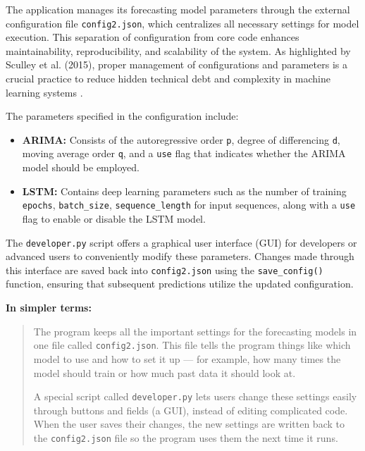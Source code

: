 The application manages its forecasting model parameters through the external configuration file \texttt{config2.json}, which centralizes all necessary settings for model execution. This separation of configuration from core code enhances maintainability, reproducibility, and scalability of the system. As highlighted by Sculley et al. (2015), proper management of configurations and parameters is a crucial practice to reduce hidden technical debt and complexity in machine learning systems \cite{sculley2015hidden}.


The parameters specified in the configuration include:

\begin{itemize}
	\item \textbf{ARIMA:} Consists of the autoregressive order \texttt{p}, degree of differencing \texttt{d}, moving average order \texttt{q}, and a \texttt{use} flag that indicates whether the ARIMA model should be employed.
	\item \textbf{LSTM:} Contains deep learning parameters such as the number of training \texttt{epochs}, \texttt{batch\_size}, \texttt{sequence\_length} for input sequences, along with a \texttt{use} flag to enable or disable the LSTM model.
\end{itemize}

The \texttt{developer.py} script offers a graphical user interface (GUI) for developers or advanced users to conveniently modify these parameters. Changes made through this interface are saved back into \texttt{config2.json} using the \texttt{save\_config()} function, ensuring that subsequent predictions utilize the updated configuration.

\vspace{0.3cm}
\noindent
\textbf{In simpler terms:} 

\begin{quote}
	The program keeps all the important settings for the forecasting models in one file called \texttt{config2.json}. This file tells the program things like which model to use and how to set it up — for example, how many times the model should train or how much past data it should look at.
	
	A special script called \texttt{developer.py} lets users change these settings easily through buttons and fields (a GUI), instead of editing complicated code. When the user saves their changes, the new settings are written back to the \texttt{config2.json} file so the program uses them the next time it runs.
\end{quote}

